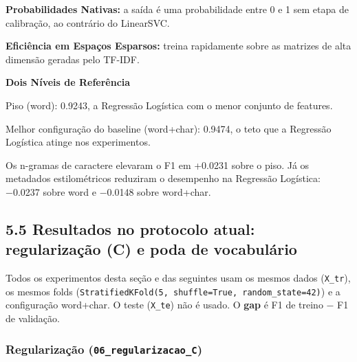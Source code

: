 \documentclass[
  brazilian,
  11pt,
]{article}
\begin{document}
\textbf{Probabilidades Nativas:} a saída é uma probabilidade entre 0 e 1 sem etapa de calibração, ao contrário do LinearSVC.

\textbf{Eficiência em Espaços Esparsos:} treina rapidamente sobre as matrizes de alta dimensão geradas pelo TF-IDF.

\textbf{Dois Níveis de Referência}

Piso (word): 0.9243, a Regressão Logística com o menor conjunto de features.

Melhor configuração do baseline (word+char): 0.9474, o teto que a Regressão Logística atinge nos experimentos.

Os n-gramas de caractere elevaram o F1 em +0.0231 sobre o piso. Já os metadados estilométricos reduziram o desempenho na Regressão Logística: −0.0237 sobre word e −0.0148 sobre word+char.

\subsection{5.5 Resultados no protocolo atual: regularização (C) e poda de vocabulário}\label{resultados-no-protocolo-atual-regularizauxe7uxe3o-c-e-poda-de-vocabuluxe1rio}

Todos os experimentos desta seção e das seguintes usam os mesmos dados (\texttt{X\_tr}), os mesmos folds (\texttt{StratifiedKFold(5,\ shuffle=True,\ random\_state=42)}) e a configuração word+char. O teste (\texttt{X\_te}) não é usado. O \textbf{gap} é F1 de treino − F1 de validação.

\subsubsection{\texorpdfstring{Regularização (\texttt{06\_regularizacao\_C})}{Regularização (06\_regularizacao\_C)}}\label{regularizauxe7uxe3o-06_regularizacao_c}
\end{document}

